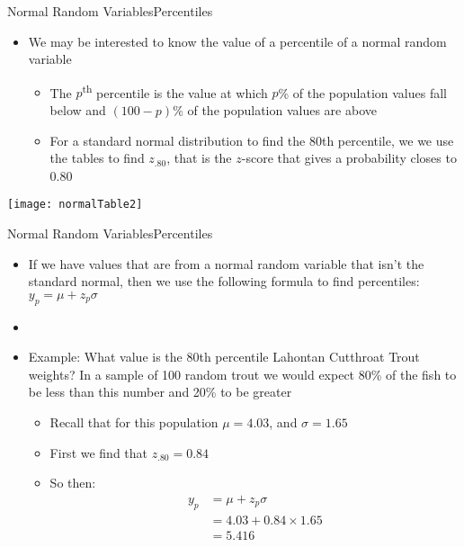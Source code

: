 \documentclass[xcolor=dvipsnames]{beamer}
\begin{document}
\begin{frame}{Normal Random Variables}{Percentiles}
	\begin{itemize}
		\item We may be interested to know the value of a percentile of a normal random variable
		\begin{itemize}
			\item The $p$\textsuperscript{th} percentile is the value at which $p$\% of the population values fall below and $(100-p)$\% of the population values are above
			\item For a standard normal distribution to find the 80th percentile, we we use the tables to find $z_{.80}$, that is the $z$-score that gives a probability closes to 0.80
		\end{itemize}
	\end{itemize}
	\begin{center}
		\texttt{[image: normalTable2]}
	\end{center}
\end{frame}

\begin{frame}{Normal Random Variables}{Percentiles}
	\begin{itemize}
		\item If we have values that are from a normal random variable that isn't the standard normal, then we use the following formula to find percentiles: $y_p = \mu + z_p \sigma$
		\item[]
		\item Example: What value is the 80th percentile Lahontan Cutthroat Trout weights? In a sample of 100 random trout we would expect 80\% of the fish to be less than this number and 20\% to be greater
		\begin{itemize}
			\item Recall that for this population $\mu = 4.03$, and $\sigma = 1.65$
			\item First we find that $z_{.80} = 0.84$
			\item So then:
			\begin{align*}
				y_p &= \mu + z_p \sigma \\
				&= 4.03 + 0.84 \times 1.65 \\
				&= 5.416
			\end{align*}
		\end{itemize}
	\end{itemize}
\end{frame}
\end{document}
